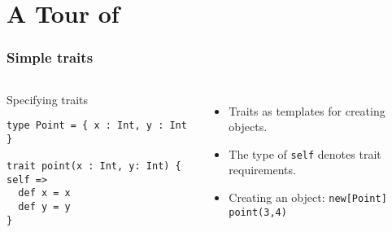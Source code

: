 \documentclass{beamer}
\begin{document}







\section{A Tour of \name}

\begin{frame}[fragile]
  \frametitle{Simple traits}


\begin{columns}[t]

\begin{exampleblock}{Specifying traits}

\begin{lstlisting}
type Point = { x : Int, y : Int }

trait point(x : Int, y: Int) { self =>
  def x = x
  def y = y
}
\end{lstlisting}

\end{exampleblock}




\begin{itemize}
\item Traits as templates for creating objects.
\item The type of \lstinline{self} denotes trait requirements.
\item Creating an object: \lstinline{new[Point] point(3,4)}
\end{itemize}


\end{columns}


\end{frame}
\end{document}
